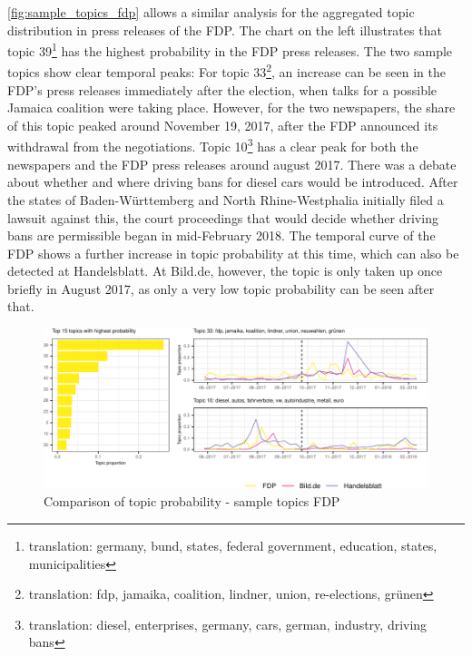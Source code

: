 \documentclass[
  12pt,
]{article}
\begin{document}
\autoref{fig:sample_topics_fdp} allows a similar analysis for the
aggregated topic distribution in press releases of the FDP. The chart on
the left illustrates that topic 39\footnote{translation: germany, bund,
  states, federal government, education, states, municipalities} has the
highest probability in the FDP press releases. The two sample topics
show clear temporal peaks: For topic 33\footnote{translation: fdp,
  jamaika, coalition, lindner, union, re-elections, grünen}, an increase
can be seen in the FDP's press releases immediately after the election,
when talks for a possible Jamaica coalition were taking place. However,
for the two newspapers, the share of this topic peaked around November
19, 2017, after the FDP announced its withdrawal from the negotiations.
Topic 10\footnote{translation: diesel, enterprises, germany, cars,
  german, industry, driving bans} has a clear peak for both the
newspapers and the FDP press releases around august 2017. There was a
debate about whether and where driving bans for diesel cars would be
introduced. After the states of Baden-Württemberg and North
Rhine-Westphalia initially filed a lawsuit against this, the court
proceedings that would decide whether driving bans are permissible began
in mid-February 2018. The temporal curve of the FDP shows a further
increase in topic probability at this time, which can also be detected
at Handelsblatt. At Bild.de, however, the topic is only taken up once
briefly in August 2017, as only a very low topic probability can be seen
after that.

\begin{figure}

{\centering \includegraphics[width=1\linewidth]{chap1_files/figure-latex/Top FDP topics-1} 

}

\caption{Comparison of topic probability - sample topics FDP \label{fig:sample_topics_fdp}}\label{fig:Top FDP topics}
\end{figure}
\end{document}
